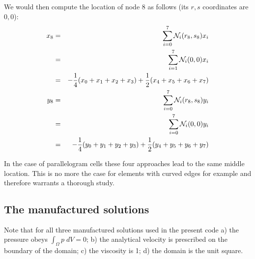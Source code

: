 \begin{itemize}
We would then compute the location of node 8 as follows (its $r,s$ coordinates are $0,0$): 
\begin{eqnarray}
x_8
&=& \sum_{i=0}^7 {\mathcal{N}}_i (r_8,s_8) x_i \nonumber\\
&=& \sum_{i=1}^7 {\mathcal{N}}_i (0,0) x_i \nonumber\\
&=& -\frac14 (x_0+x_1+x_2+x_3) + \frac12 (x_4+x_5+x_6+x_7) \nonumber\\
y_8 
&=& \sum_{i=0}^7 {\mathcal{N}}_i (r_8,s_8) y_i \nonumber\\
&=& \sum_{i=0}^7 {\mathcal{N}}_i (0,0) y_i \nonumber\\
&=& -\frac14 (y_0+y_1+y_2+y_3) + \frac12 (y_4+y_5+y_6+y_7) \nonumber
\end{eqnarray}

\end{itemize}

In the case of parallelogram cells these four approaches lead to the same 
middle location. This is no more the case for elements with curved edges
for example and therefore warrants a thorough study.

\subsection*{The manufactured solutions}

Note that for all three manufactured solutions used in the present code 
a) the pressure obeys $\int_{\Omega} p \; dV = 0$;
b) the analytical velocity is prescribed on the boundary of the domain; 
c) the viscosity is 1; d) the domain is the unit square. 

